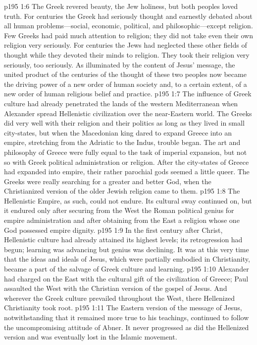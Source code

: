 \vs p195 1:6 The Greek revered beauty, the Jew holiness, but both peoples loved truth. For centuries the Greek had seriously thought and earnestly debated about all human problems---social, economic, political, and philosophic---except religion. Few Greeks had paid much attention to religion; they did not take even their own religion very seriously. For centuries the Jews had neglected these other fields of thought while they devoted their minds to religion. They took their religion very seriously, too seriously. As illuminated by the content of Jesus’ message, the united product of the centuries of the thought of these two peoples now became the driving power of a new order of human society and, to a certain extent, of a new order of human religious belief and practice.\plusone
\pc \vs p195 1:7 The influence of Greek culture had already penetrated the lands of the western Mediterranean when Alexander spread Hellenistic civilization over the near\hyp{}Eastern world. The Greeks did very well with their religion and their politics as long as they lived in small city\hyp{}states, but when the Macedonian king dared to expand Greece into an empire, stretching from the Adriatic to the Indus, trouble began. The art and philosophy of Greece were fully equal to the task of imperial expansion, but not so with Greek political administration or religion. After the city\hyp{}states of Greece had expanded into empire, their rather parochial gods seemed a little queer. The Greeks were really searching for  a greater and better God, when the Christianized version of the older Jewish religion came to them.
\vs p195 1:8 The Hellenistic Empire, as such, could not endure. Its cultural sway continued on, but it endured only after securing from the West the Roman political genius for empire administration and after obtaining from the East a religion whose one God possessed empire dignity.
\vs p195 1:9 In the first century after Christ, Hellenistic culture had already attained its highest levels; its retrogression had begun; learning was advancing but genius was declining. It was at this very time that the ideas and ideals of Jesus, which were partially embodied in Christianity, became a part of the salvage of Greek culture and learning.
\vs p195 1:10 Alexander had charged on the East with the cultural gift of the civilization of Greece; Paul assaulted the West with the Christian version of the gospel of Jesus. And wherever the Greek culture prevailed throughout the West, there Hellenized Christianity took root.
\pc \vs p195 1:11 The Eastern version of the message of Jesus, notwithstanding that it remained more true to his teachings, continued to follow the uncompromising attitude of Abner. It never progressed as did the Hellenized version and was eventually lost in the Islamic movement.

